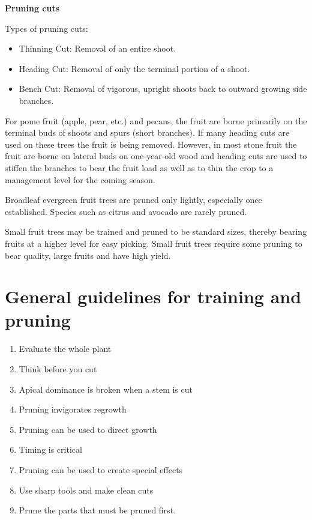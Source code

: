 \documentclass[
]{article}
\providecommand{\tightlist}{%
  \setlength{\itemsep}{0pt}\setlength{\parskip}{0pt}}
\begin{document}
\textbf{Pruning cuts}

Types of pruning cuts:

\begin{itemize}
\tightlist
\item
  Thinning Cut: Removal of an entire shoot.
\item
  Heading Cut: Removal of only the terminal portion of a shoot.
\item
  Bench Cut: Removal of vigorous, upright shoots back to outward growing side branches.
\end{itemize}

For pome fruit (apple, pear, etc.) and pecans, the fruit are borne primarily on the terminal buds of shoots and spurs (short branches). If many heading cuts are used on these trees the fruit is being removed. However, in most stone fruit the fruit are borne on lateral buds on one-year-old wood and heading cuts are used to stiffen the branches to bear the fruit load as well as to thin the crop to a management level for the coming season.

Broadleaf evergreen fruit trees are pruned only lightly, especially once established. Species such as citrus and avocado are rarely pruned.

Small fruit trees may be trained and pruned to be standard sizes, thereby bearing fruits at a higher level for easy picking. Small fruit trees require some pruning to bear quality, large fruits and have high yield.

\hypertarget{general-guidelines-for-training-and-pruning}{%
\section*{General guidelines for training and pruning}\label{general-guidelines-for-training-and-pruning}}

\begin{enumerate}
\def\labelenumi{\arabic{enumi}.}
\tightlist
\item
  Evaluate the whole plant
\item
  Think before you cut
\item
  Apical dominance is broken when a stem is cut
\item
  Pruning invigorates regrowth
\item
  Pruning can be used to direct growth
\item
  Timing is critical
\item
  Pruning can be used to create special effects
\item
  Use sharp tools and make clean cuts
\item
  Prune the parts that must be pruned first.
\end{enumerate}
\end{document}

